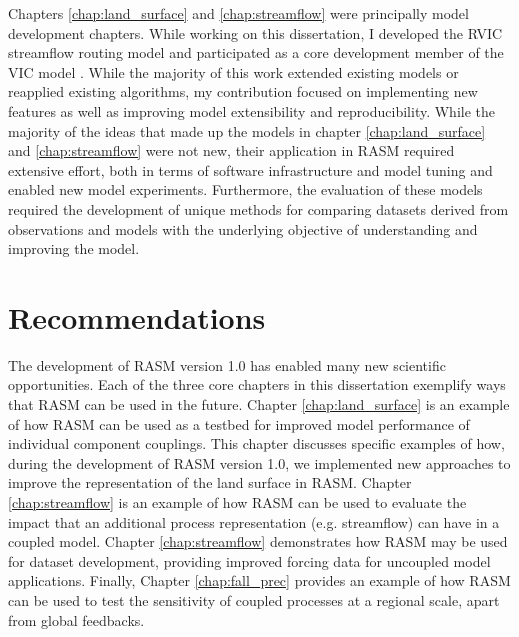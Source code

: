 Chapters \ref{chap:land_surface} and \ref{chap:streamflow} were principally model development chapters.
While working on this dissertation, I developed the RVIC streamflow routing model \citep[see also \ref{sec:rvic_dev} ;][]{Hamman_2015,Hamman_2016b} and participated as a core development member of the VIC model \citep[see also \ref{sec:vic_dev}]{Hamman_2016c,Hamman_2016d}.
While the majority of this work extended existing models or reapplied existing algorithms, my contribution focused on implementing new features as well as improving model extensibility and reproducibility.
While the majority of the ideas that made up the models in chapter \ref{chap:land_surface} and \ref{chap:streamflow} were not new, their application in RASM required extensive effort, both in terms of software infrastructure and model tuning and enabled new model experiments.
Furthermore, the evaluation of these models required the development of unique methods for comparing datasets derived from observations and models with the underlying objective of understanding and improving the model.

\section{Recommendations}
The development of RASM version 1.0 has enabled many new scientific opportunities.
Each of the three core chapters in this dissertation exemplify ways that RASM can be used in the future.
Chapter \ref{chap:land_surface} is an example of how RASM can be used as a testbed for improved model performance of individual component couplings.
This chapter discusses specific examples of how, during the development of RASM version 1.0, we implemented new approaches to improve the representation of the land surface in RASM.
Chapter \ref{chap:streamflow} is an example of how RASM can be used to evaluate the impact that an additional process representation (e.g. streamflow) can have in a coupled model.
Chapter \ref{chap:streamflow} demonstrates how RASM may be used for dataset development, providing improved forcing data for uncoupled model applications.
Finally, Chapter \ref{chap:fall_prec} provides an example of how RASM can be used to test the sensitivity of coupled processes at a regional scale, apart from global feedbacks.

